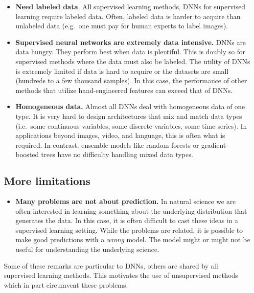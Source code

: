 \documentclass[%
oneside,                 %
final,                   %
10pt]{article}
\begin{document}
\begin{itemize}
\item \textbf{Need labeled data}. All supervised learning methods, DNNs for supervised learning require labeled data. Often, labeled data is harder to acquire than unlabeled data (e.g.~one must pay for human experts to label images).

\item \textbf{Supervised neural networks are extremely data intensive.} DNNs are data hungry. They perform best when data is plentiful. This is doubly so for supervised methods where the data must also be labeled. The utility of DNNs is extremely limited if data is hard to acquire or the datasets are small (hundreds to a few thousand samples). In this case, the performance of other methods that utilize hand-engineered features can exceed that of DNNs.

\item \textbf{Homogeneous data.} Almost all DNNs deal with homogeneous data of one type. It is very hard to design architectures that mix and match data types (i.e.~some continuous variables, some discrete variables, some time series). In applications beyond images, video, and language, this is often what is required. In contrast, ensemble models like random forests or gradient-boosted trees have no difficulty handling mixed data types.
\end{itemize}

\noindent
\subsection{More limitations}

\begin{itemize}
\item \textbf{Many problems are not about prediction.} In natural science we are often interested in learning something about the underlying distribution that generates the data. In this case, it is often difficult to cast these ideas in a supervised learning setting. While the problems are related, it is possible to make good predictions with a \emph{wrong} model. The model might or might not be useful for understanding the underlying science.
\end{itemize}

\noindent
Some of these remarks are particular to DNNs, others are shared by all supervised learning methods. This motivates the use of unsupervised methods which in part circumvent these problems.
\end{document}
